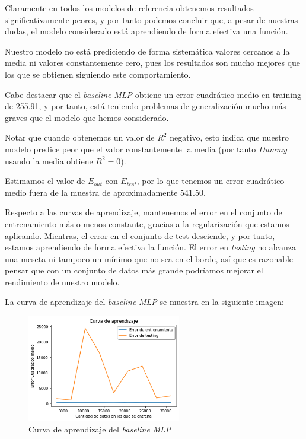 \documentclass[11pt]{article}
\begin{document}
Claramente en todos los modelos de referencia obtenemos resultados significativamente peores, y por tanto podemos concluir que, a pesar de nuestras dudas, el modelo considerado está aprendiendo de forma efectiva una función.

Nuestro modelo no está prediciendo de forma sistemática valores cercanos a la media ni valores constantemente cero, pues los resultados son mucho mejores que los que se obtienen siguiendo este comportamiento.

Cabe destacar que el \emph{baseline} \emph{MLP} obtiene un error cuadrático medio en training de 255.91, y por tanto, está teniendo problemas de generalización mucho más graves que el modelo que hemos considerado.

Notar que cuando obtenemos un valor de $R^2$ negativo, esto indica que nuestro modelo predice peor que el valor constantemente la media (por tanto \emph{Dummy} usando la media obtiene $R^2 = 0$).

Estimamos el valor de $E_{out}$ con $E_{test}$, por lo que tenemos un error cuadrático medio fuera de la muestra de aproximadamente 541.50.

Respecto a las curvas de aprendizaje, mantenemos el error en el conjunto de entrenamiento más o menos constante, gracias a la regularización que estamos aplicando. Mientras, el error en el conjunto de test desciende, y por tanto, estamos aprendiendo de forma efectiva la función. El error en \emph{testing} no alcanza una meseta ni tampoco un mínimo que no sea en el borde, así que es razonable pensar que con un conjunto de datos más grande podríamos mejorar el rendimiento de nuestro modelo.

La curva de aprendizaje del \emph{baseline} \emph{MLP} se muestra en la siguiente imagen:

\begin{figure}[H]
  \centering
  \includegraphics[width=0.6\textwidth]{curva_aprendizaje_mlp}
  \caption{Curva de aprendizaje del \emph{baseline} \emph{MLP}}
\end{figure}
\end{document}
